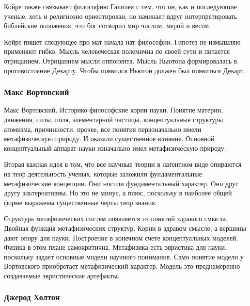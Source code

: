 \documentclass[a4paper, 12pt]{article}
\begin{document}
Койре также связывает философию Галилея с тем, что он, как и последующие 
ученые, хоть и религиозно ориентирован, но начинает вдруг 
интерпретировать библейские положения, что бог сотворил мир числом, 
мерой и весом.

Койре пишет следующее про мат начала нат философии. Гипотез не измышляю 
применяют гибко. Мысль человеческая полемична по своей сути и питается 
отрицанием. Отрицанием мысли оппонента. Мысль Ньютона формировалась 
в противостояние Декарту. Чтобы появился Ньютон должен был появиться 
Декарт.


\subsubsection{Макс Вортовский}

Макс Вортовский. Историко-философские корни науки. Понятие материи, 
движения, силы, поля, элементарной частицы, концептуальные структуры 
атомизма, причинности, прочее, все понятия первоначально имели 
метафизическую природу. И оказали существенное влияние. Основной 
концептуальный аппарат науки изначально имел метафизическую природу.

Вторая важная идея в том, что все научные теории в латентном виде 
опираются на теор деятельность ученых, которые заложили фундаментальные 
метафизические концепции. Они носили фундаментальный характер. Они друг 
другу альтернативны. Но это не минус, а плюс, поскольку в наиболее общей 
форме выражены существенные черты теор знания.

Структура метафизических систем появляется из понятий здравого смысла. 
Двойная функция метафизических структур. Корни в здравом смысле, 
а вершины дают опору для науки. Построение в конечном счете 
концептуальных моделей. Физика в этом плане самокритична. Метафизика 
есть эвристика для науки, поскольку задает основные модели научного 
понимания. Само понятие модели у Вортовского приобретает метафизический 
характер. Модель это преднамеренно создаваемые эвристические артефакты.


\subsubsection{Джерод Холтон}
\end{document}
